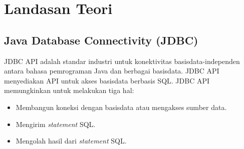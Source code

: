 \chapter{Landasan Teori}
\label{chap:LandasanTeori}

\section{Java Database Connectivity (JDBC)}
\label{sec:jdbc}
JDBC API \cite{jdbc} adalah standar industri untuk konektivitas basisdata-independen antara bahasa pemrograman Java dan berbagai basisdata. JDBC API menyediakan API untuk akses basisdata berbasis SQL. JDBC API memungkinkan untuk melakukan tiga hal: 
\begin{itemize}
	\item Membangun koneksi dengan basisdata atau mengakses sumber data.
	\item Mengirim \textit{statement} SQL.
	\item Mengolah hasil dari \textit{statement} SQL.
\end{itemize}

